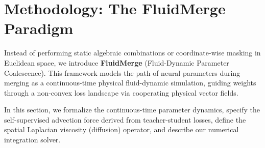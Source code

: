 \section{Methodology: The FluidMerge Paradigm}
\label{sec:method}

Instead of performing static algebraic combinations or coordinate-wise masking in Euclidean space, we introduce \textbf{FluidMerge} (Fluid-Dynamic Parameter Coalescence). This framework models the path of neural parameters during merging as a continuous-time physical fluid-dynamic simulation, guiding weights through a non-convex loss landscape via cooperating physical vector fields.

In this section, we formalize the continuous-time parameter dynamics, specify the self-supervised advection force derived from teacher-student losses, define the spatial Laplacian viscosity (diffusion) operator, and describe our numerical integration solver.


